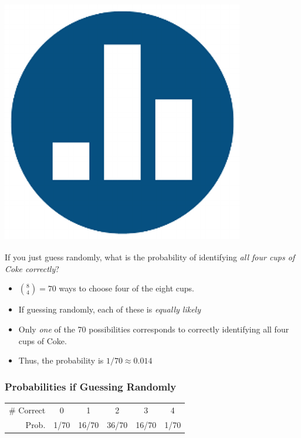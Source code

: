\begin{frame}
\frametitle{\includegraphics[scale = 0.05]{./images/clicker}}
If you just guess randomly, what is the probability of identifying \emph{all four cups of Coke correctly}?
\pause
\begin{itemize}
\item ${8\choose 4}=70$ ways to choose four of the eight cups. \pause
\item If guessing randomly, each of these is \emph{\alert{equally likely}} \pause
\item Only \emph{\alert{one}} of the 70 possibilities corresponds to correctly \pause identifying all four cups of Coke. \pause
\item Thus, the probability is $1/70 \approx 0.014$
\end{itemize}
\end{frame}
\begin{frame}
\frametitle{Probabilities if Guessing Randomly}
	\begin{center}
		\begin{tabular}{rccccc}
		\hline
		\# Correct & 0 & 1 & 2 & 3 & 4\\
		Prob.&1/70 & 16/70 & 36/70 & 16/70 &1/70\\
		\hline
		\end{tabular}
	\end{center}
\end{frame}
